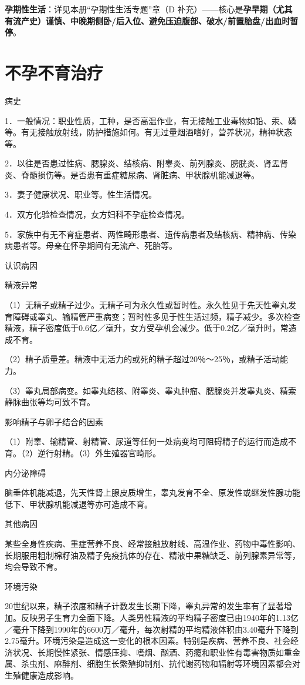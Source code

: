 \documentclass[12pt,UTF8,openany]{ctexbook}
\begin{document}
\textbf{孕期性生活}：详见本册“孕期性生活专题”章（D 补充）——核心是\textbf{孕早期（尤其有流产史）谨慎、中晚期侧卧/后入位、避免压迫腹部、破水/前置胎盘/出血时暂停}。

\chapter{不孕不育治疗}


病史


1．一般情况：职业性质，工种，是否高温作业，有无接触工业毒物如铅、汞、磷等。有无接触放射线，防护措施如何。有无过量烟酒嗜好，营养状况，精神状态等。

2．以往是否患过性病、腮腺炎、结核病、附睾炎、前列腺炎、膀胱炎、肾盂肾炎、脊髓损伤等。是否患有重症糖尿病、肾脏病、甲状腺机能减退等。

3．妻子健康状况、职业等。性生活情况。

4．双方化验检查情况，女方妇科不孕症检查情况。

5．家族中有无不育症患者、两性畸形患者、遗传病患者及结核病、精神病、传染病患者等。母亲在怀孕期间有无流产、死胎等。





认识病因


精液异常

（1）无精子或精子过少。无精子可为永久性或暂时性。永久性见于先天性睾丸发育障碍或睾丸、输精管严重病变；暂时性多见于性生活过频，精子减少。多次检查精液，精子密度低于0.6亿／毫升，女方受孕机会减少。低于0.2亿／毫升时，常造成不育。

（2）精子质量差。精液中无活力的或死的精子超过20％～25％，或精子活动能力。

（3）睾丸局部病变。如睾丸结核、附睾炎、睾丸肿瘤、腮腺炎并发睾丸炎、精索静脉曲张等均可致不育。

影响精子与卵子结合的因素

（1）附睾、输精管、射精管、尿道等任何一处病变均可阻碍精子的运行而造成不育。（2）逆行射精。（3）外生殖器官畸形。

内分泌障碍

脑垂体机能减退，先天性肾上腺皮质增生，睾丸发育不全、原发性或继发性腺功能低下、甲状腺机能减退等亦可造成不育。

其他病因

某些全身性疾病、重症营养不良、经常接触放射线、高温作业、药物中毒性影响、长期服用粗制棉籽油及精子免疫抗体的存在、精液中果糖缺乏、前列腺素异常等，均会导致不育。

环境污染

20世纪以来，精子浓度和精子计数发生长期下降，睾丸异常的发生率有了显著增加。反映男子生育力全面下降。人类男性精液的平均精子密度已由1940年的1.13亿／毫升下降到1990年的6600万／毫升，每次射精的平均精液体积由3.40毫升下降到2.75毫升。环境污染是造成这一变化的根本因素。特别是疾病、营养不良、社会经济状况、长期慢性紧张、情感压抑、嗜烟、酗酒、药瘾和职业性有毒害物质如重金属、杀虫剂、麻醉剂、细胞生长繁殖抑制剂、抗代谢药物和辐射等环境因素都会对生殖健康造成影响。
\end{document}
